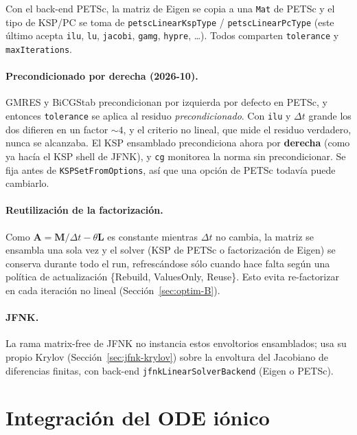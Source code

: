 \documentclass[11pt,a4paper]{article}
\newcommand{\code}[1]{\texttt{\small #1}}
\newcommand{\Mmass}{\mathbf{M}}
\newcommand{\Lop}{\mathbf{L}}
\newcommand{\Aimp}{\mathbf{A}}
\begin{document}
Con el back-end PETSc, la matriz de Eigen se copia a una \code{Mat} de PETSc y el
tipo de KSP/PC se toma de \code{petscLinearKspType} / \code{petscLinearPcType}
(este último acepta \code{ilu}, \code{lu}, \code{jacobi}, \code{gamg}, \code{hypre},
\dots). Todos comparten \code{tolerance} y \code{maxIterations}.

\paragraph{Precondicionado por derecha (2026-10).} GMRES y BiCGStab
precondicionan por izquierda por defecto en PETSc, y entonces \code{tolerance} se
aplica al residuo \emph{precondicionado}. Con \code{ilu} y $\Delta t$ grande los
dos difieren en un factor $\sim4$, y el criterio no lineal, que mide el residuo
verdadero, nunca se alcanzaba. El KSP ensamblado precondiciona ahora por
\textbf{derecha} (como ya hacía el KSP shell de JFNK), y \code{cg} monitorea la
norma sin precondicionar. Se fija antes de \code{KSPSetFromOptions}, así que una
opción de PETSc todavía puede cambiarlo.

\paragraph{Reutilización de la factorización.}
Como $\Aimp=\Mmass/\Delta t-\theta\Lop$ es constante mientras $\Delta t$ no cambia,
la matriz se ensambla una sola vez y el solver (KSP de PETSc o factorización de
Eigen) se conserva durante todo el run, refrescándose sólo cuando hace falta según
una política de actualización \{Rebuild, ValuesOnly, Reuse\}. Esto evita
re-factorizar en cada iteración no lineal (Sección~\ref{sec:optim-B}).

\paragraph{JFNK.}
La rama matrix-free de JFNK no instancia estos envoltorios ensamblados; usa su
propio Krylov (Sección~\ref{sec:jfnk-krylov}) sobre la envoltura del Jacobiano de
diferencias finitas, con back-end \code{jfnkLinearSolverBackend} (Eigen o PETSc).

\section{Integración del ODE iónico}
\end{document}
